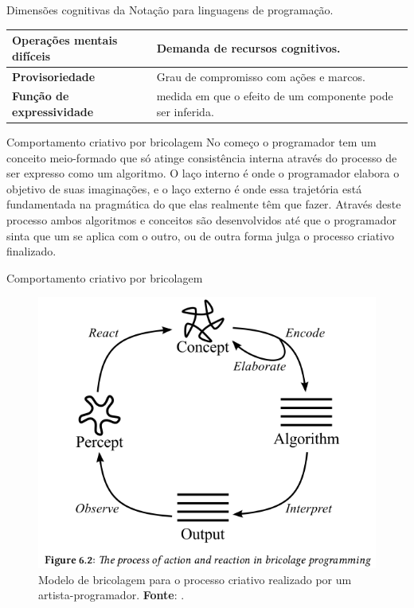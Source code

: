 \documentclass[aspectratio=169]{beamer}
\begin{document}
\begin{frame}[allowframebreaks]{Dimensões cognitivas da Notação para linguagens de programação.}
\begin{table}[!h]
\begin{tabular}{ | p{5cm}| p{5cm} |}
    \tiny \textbf{Operações mentais difíceis}  
    & \tiny Demanda de recursos cognitivos. \\
    \hline

    \tiny \textbf{Provisoriedade}  
    & \tiny Grau de compromisso com ações e marcos. \\
    \hline
    
    \tiny \textbf{Função de expressividade}  
    & \tiny medida em que o efeito de um componente pode ser inferida.\\
    \hline
    \hline
   
    \end{tabular}
\label{tab:dimensoes}
\end{table} 
\end{frame}

\begin{frame}{Comportamento criativo por bricolagem}
No começo o programador tem um conceito meio-formado que só atinge consistência interna através do processo de ser expresso como um algoritmo. O laço interno é onde o programador elabora o objetivo de suas imaginações, e o laço externo é onde essa trajetória está fundamentada na pragmática do que elas realmente têm que fazer. Através deste processo ambos algoritmos e conceitos são desenvolvidos até que o programador sinta que um se aplica com o outro, ou de outra forma julga o processo criativo finalizado.
\end{frame}

\begin{frame}{Comportamento criativo por bricolagem}
\begin{figure}[h]
  \centering
  \includegraphics[scale=0.35]{imagens/processo_criativo.png}
  \caption{Modelo de bricolagem para o processo criativo realizado por um artista-programador. \textbf{Fonte}: . }
  \label{fig:processo_criativo}
\end{figure}
\end{frame}
\end{document}

